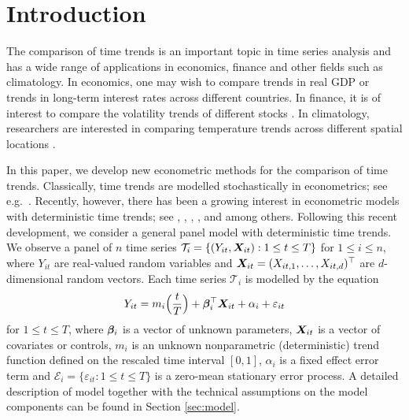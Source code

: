 \documentclass[12pt]{article}
\makeatletter
\renewcommand{\eqref}[1]{\tagform@{\ref{#1}}}
\makeatother
\begin{document}
\newpage
{} %

\allowdisplaybreaks[1]

\setlength{\abovedisplayskip}{3pt}
\setlength{\belowdisplayskip}{3pt}



\section{Introduction}\label{sec:intro}


The comparison of time trends is an important topic in time series analysis and has a wide range of applications in economics, finance and other fields such as climatology. In economics, one may wish to compare trends in real GDP \citep[][]{Grier1989} or trends in long-term interest rates \citep[][]{Christiansen1997} across different countries. In finance, it is of interest to compare the volatility trends of different stocks \citep[][]{Nyblom2000}. In climatology, researchers are interested in comparing temperature trends
across different spatial locations \citep[][]{KarolyWu2005}. 


In this paper, we develop new econometric methods for the comparison of time trends. Classically, time trends are modelled stochastically in econometrics; see e.g.\ \cite{Stock1988}. Recently, however, there has been a growing interest in econometric models with deterministic time trends; see \cite{Cai2007}, \cite{Atak2011}, \cite{Robinson2012}, \cite{ChenGaoLi2012}, \cite{Zhang2012} and \cite{Hidalgo2014} among others. Following this recent development, we consider a general panel model with deterministic time trends. We observe a panel of $n$ time series $\mathcal{T}_i = \{ (Y_{it},\boldsymbol{X}_{it}): 1 \le t \le T \}$ for $1 \le i \le n$, where $Y_{it}$ are real-valued random variables and $\boldsymbol{X}_{it} = (X_{it,1},\ldots, X_{it, d})^\top$ are $d$-dimensional random vectors. Each time series $\mathcal{T}_i$ is modelled by the equation
\begin{equation}\label{eq:model}
Y_{it} = m_i \Big( \frac{t}{T} \Big) + \bm{\beta}_i^\top \boldsymbol{X}_{it} + \alpha_i + \varepsilon_{it}
\end{equation}
for $1 \le t \le T$, where $\bm{\beta}_i$ is a vector of unknown parameters, $\boldsymbol{X}_{it}$ is a vector of covariates or controls, $m_i$ is an unknown nonparametric (deterministic) trend function defined on the rescaled time interval $[0,1]$, $\alpha_i$ is a fixed effect error term and $\mathcal{E}_i = \{ \varepsilon_{it}: 1 \le t \le T \}$ is a zero-mean stationary error process. A detailed description of model \eqref{eq:model} together with the technical assumptions on the model components can be found in Section \ref{sec:model}.
\end{document}
